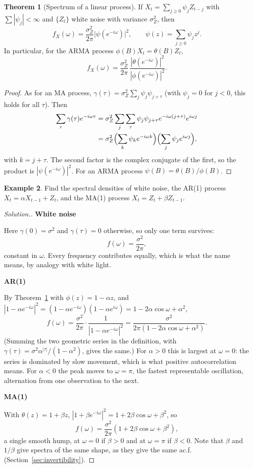 \documentclass[11pt,a4paper]{article}
\theoremstyle{definition}
\newtheorem{thm}{Theorem}[subsection]
\newtheorem{exa}[thm]{Example}
\newenvironment{solution}
  {\renewcommand{\qedsymbol}{}\begin{proof}[\textit{Solution}.]}
  {\end{proof}}
\newcommand{\subhead}[1]{%
  \par\medskip\noindent\textbf{#1}\par\nobreak\smallskip}
\begin{document}
\begin{thm}[Spectrum of a linear process]\label{thm:linear-filter}
If $X_t = \sum_{j\ge0}\psi_jZ_{t-j}$ with $\sum|\psi_j| < \infty$ and $\{Z_t\}$ white noise with variance $\sigma_Z^2$, then
\[
f_X(\omega) = \frac{\sigma_Z^2}{2\pi}\bigl|\psi(e^{-i\omega})\bigr|^2 , \qquad \psi(z) = \sum_{j\ge0}\psi_jz^j .
\]
In particular, for the ARMA process $\phi(B)X_t = \theta(B)Z_t$,
\[
f_X(\omega) = \frac{\sigma_Z^2}{2\pi}\,\frac{|\theta(e^{-i\omega})|^2}{|\phi(e^{-i\omega})|^2} .
\]
\end{thm}

\begin{proof}
As for an MA process, $\gamma(\tau) = \sigma_Z^2\sum_j\psi_j\psi_{j+\tau}$ (with $\psi_j = 0$ for $j < 0$, this holds for all $\tau$). Then
\begin{align*}
\sum_\tau\gamma(\tau)e^{-i\omega\tau} &= \sigma_Z^2\sum_j\sum_\tau\psi_j\psi_{j+\tau}e^{-i\omega(j+\tau)}e^{i\omega j} \\
&= \sigma_Z^2\Bigl(\sum_k\psi_ke^{-i\omega k}\Bigr)\Bigl(\sum_j\psi_je^{i\omega j}\Bigr) ,
\end{align*}
with $k = j + \tau$. The second factor is the complex conjugate of the first, so the product is $|\psi(e^{-i\omega})|^2$. For an ARMA process
$\psi(B) = \theta(B)/\phi(B)$.
\end{proof}

\begin{exa}\label{exa:spectra}
Find the spectral densities of white noise, the AR(1) process $X_t = \alpha X_{t-1} + Z_t$, and the MA(1) process $X_t = Z_t + \beta Z_{t-1}$.
\end{exa}

\begin{solution}
\subhead{White noise}
Here $\gamma(0) = \sigma^2$ and $\gamma(\tau) = 0$ otherwise, so only one term survives:
\[
f(\omega) = \frac{\sigma^2}{2\pi} ,
\]
constant in $\omega$. Every frequency contributes equally, which is what the name means, by analogy with white
light.

\subhead{AR(1)}
By Theorem~\ref{thm:linear-filter} with $\phi(z) = 1 - \alpha z$, and $|1 - \alpha e^{-i\omega}|^2 = (1 - \alpha e^{-i\omega})(1 - \alpha e^{i\omega}) = 1 - 2\alpha\cos\omega + \alpha^2$,
\[
f(\omega) = \frac{\sigma^2}{2\pi}\cdot\frac{1}{|1 - \alpha e^{-i\omega}|^2} = \frac{\sigma^2}{2\pi(1 - 2\alpha\cos\omega + \alpha^2)} .
\]
(Summing the two geometric series in the definition, with $\gamma(\tau) = \sigma^2\alpha^{|\tau|}/(1 - \alpha^2)$, gives the same.) For $\alpha > 0$ this is largest at $\omega = 0$: the
series is dominated by slow movement, which is what positive autocorrelation means. For $\alpha < 0$ the peak moves
to $\omega = \pi$, the fastest representable oscillation, alternation from one observation to the next.

\subhead{MA(1)}
With $\theta(z) = 1 + \beta z$, $|1 + \beta e^{-i\omega}|^2 = 1 + 2\beta\cos\omega + \beta^2$, so
\[
f(\omega) = \frac{\sigma^2}{2\pi}(1 + 2\beta\cos\omega + \beta^2) ,
\]
a single smooth hump, at $\omega = 0$ if $\beta > 0$ and at $\omega = \pi$ if $\beta < 0$. Note that $\beta$ and $1/\beta$ give spectra of the same shape, as they
give the same ac.f. (Section~\ref{sec:invertibility}).
\end{solution}
\end{document}
